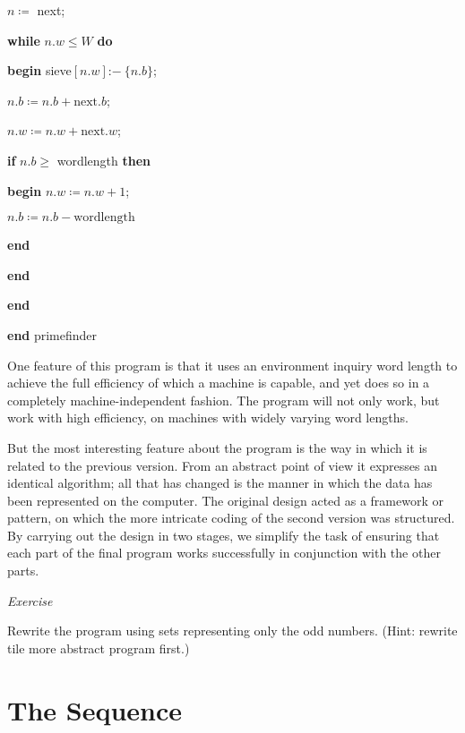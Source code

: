 \quad \quad \quad \quad $n\coloneq$ next;

\quad \quad \quad \quad \textbf{while} $n.w \leqslant W$ \textbf{do}

\quad \quad \quad \quad \quad \textbf{begin} sieve$[n.w]$:$-\ \{n.b\}$;

\quad \quad \quad \quad \quad \quad $n.b\coloneq n.b + \text{next}.b$;

\quad \quad \quad \quad \quad \quad $n.w\coloneq n. w + \text{next}.w$;

\quad \quad \quad \quad \quad \quad \textbf{if} $n.b \geqslant$ wordlength \textbf{then}

\quad \quad \quad \quad \quad \quad \textbf{begin} $n.w\coloneq n.w + 1$;

\quad \quad \quad \quad \quad \quad \quad $n.b\coloneq n.b - \text{wordlength}$

\quad \quad \quad \quad \quad \quad \textbf{end}

\quad \quad \quad \quad \quad \textbf{end}

\quad \quad \quad \textbf{end}

\quad \textbf{end} primefinder

One feature of this program is that it uses an environment inquiry word length to achieve the full efficiency of which a machine is capable, and yet does so in a completely machine-independent fashion. The program will not only work, but work with high efficiency, on machines with widely varying word lengths.

But the most interesting feature about the program is the way in which it is related to the previous version. From an abstract point of view it expresses an identical algorithm; all that has changed is the manner in which the data has been represented on the computer. The original design acted as a framework or pattern, on which the more intricate coding of the second version was structured. By carrying out the design in two stages, we simplify the task of ensuring that each part of the final program works successfully in conjunction with the other parts.

\noindent
\textit{Exercise}
\nopagebreak

\noindent
Rewrite the program using sets representing only the odd numbers. (Hint: rewrite tile more abstract program first.)

\section[The sequence]{The Sequence}

